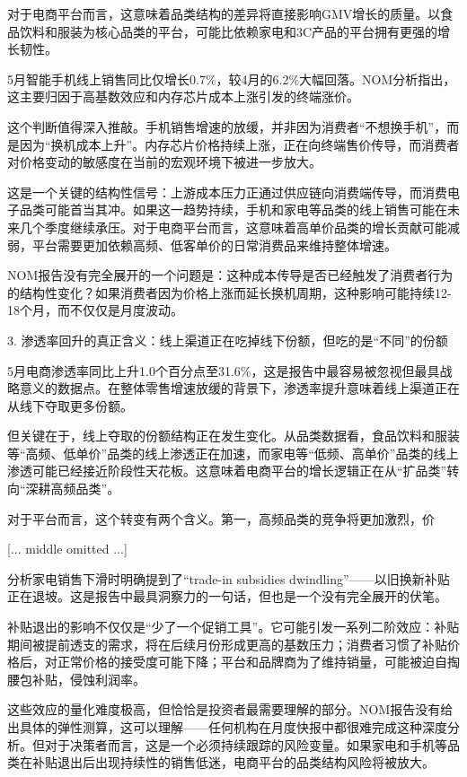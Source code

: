 \documentclass[11pt]{ctexart}
\begin{document}
对于电商平台而言，这意味着品类结构的差异将直接影响GMV增长的质量。以食品饮料和服装为核心品类的平台，可能比依赖家电和3C产品的平台拥有更强的增长韧性。

5月智能手机线上销售同比仅增长0.7\%，较4月的6.2\%大幅回落。NOM分析指出，这主要归因于高基数效应和内存芯片成本上涨引发的终端涨价。

这个判断值得深入推敲。手机销售增速的放缓，并非因为消费者“不想换手机”，而是因为“换机成本上升”。内存芯片价格持续上涨，正在向终端售价传导，而消费者对价格变动的敏感度在当前的宏观环境下被进一步放大。

这是一个关键的结构性信号：上游成本压力正通过供应链向消费端传导，而消费电子品类可能首当其冲。如果这一趋势持续，手机和家电等品类的线上销售可能在未来几个季度继续承压。对于电商平台而言，这意味着高单价品类的增长贡献可能减弱，平台需要更加依赖高频、低客单价的日常消费品来维持整体增速。

NOM报告没有完全展开的一个问题是：这种成本传导是否已经触发了消费者行为的结构性变化？如果消费者因为价格上涨而延长换机周期，这种影响可能持续12-18个月，而不仅仅是月度波动。

3. 渗透率回升的真正含义：线上渠道正在吃掉线下份额，但吃的是“不同”的份额

5月电商渗透率同比上升1.0个百分点至31.6\%，这是报告中最容易被忽视但最具战略意义的数据点。在整体零售增速放缓的背景下，渗透率提升意味着线上渠道正在从线下夺取更多份额。

但关键在于，线上夺取的份额结构正在发生变化。从品类数据看，食品饮料和服装等“高频、低单价”品类的线上渗透正在加速，而家电等“低频、高单价”品类的线上渗透可能已经接近阶段性天花板。这意味着电商平台的增长逻辑正在从“扩品类”转向“深耕高频品类”。

对于平台而言，这个转变有两个含义。第一，高频品类的竞争将更加激烈，价

[... middle omitted ...]

分析家电销售下滑时明确提到了“trade-in subsidies dwindling”——以旧换新补贴正在退坡。这是报告中最具洞察力的一句话，但也是一个没有完全展开的伏笔。

补贴退出的影响不仅仅是“少了一个促销工具”。它可能引发一系列二阶效应：补贴期间被提前透支的需求，将在后续月份形成更高的基数压力；消费者习惯了补贴价格后，对正常价格的接受度可能下降；平台和品牌商为了维持销量，可能被迫自掏腰包补贴，侵蚀利润率。

这些效应的量化难度极高，但恰恰是投资者最需要理解的部分。NOM报告没有给出具体的弹性测算，这可以理解——任何机构在月度快报中都很难完成这种深度分析。但对于决策者而言，这是一个必须持续跟踪的风险变量。如果家电和手机等品类在补贴退出后出现持续性的销售低迷，电商平台的品类结构风险将被放大。
\end{document}

